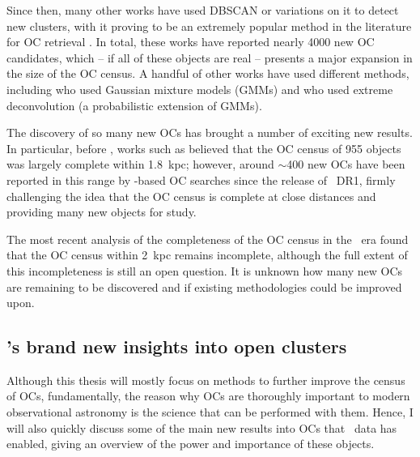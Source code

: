 Since then, many other works have used DBSCAN or variations on it to detect new clusters, with it proving to be an extremely popular method in the literature for OC retrieval \citep{castro-ginard_hunting_2019,castro-ginard_hunting_2020,castro-ginard_hunting_2022,liu_catalog_2019,he_catalogue_2021,he_new_2022,he_unveiling_hidden_2022,he_blind_allsky_2022,qin_discovery_2021,hao_sixteen_2020,hao_newly_2022,qin_hunting_2023}. In total, these works have reported nearly 4000 new OC candidates, which -- if all of these objects are real -- presents a major expansion in the size of the OC census. A handful of other works have used different methods, including \cite{cantat-gaudin_gaia_2019} who used Gaussian mixture models (GMMs) and \cite{jaehnig_membership_2021} who used extreme deconvolution (a probabilistic extension of GMMs).

The discovery of so many new OCs has brought a number of exciting new results. In particular, before \gaia, works such as \cite{kharchenko_global_2013} believed that the OC census of 955 objects was largely complete within 1.8~kpc; however, around $\sim$400 new OCs have been reported in this range by \gaia-based OC searches since the release of \gaia\ DR1, firmly challenging the idea that the OC census is complete at close distances and providing many new objects for study.

The most recent analysis of the completeness of the OC census in the \gaia\ era \citep{anders_milky_2020} found that the OC census within 2~kpc remains incomplete, although the full extent of this incompleteness is still an open question. It is unknown how many new OCs are remaining to be discovered and if existing methodologies could be improved upon.


\subsection{\gaia's brand new insights into open clusters}
\label{sec:intro:gaia:insights}

Although this thesis will mostly focus on methods to further improve the census of OCs, fundamentally, the reason why OCs are thoroughly important to modern observational astronomy is the science that can be performed with them. Hence, I will also quickly discuss some of the main new results into OCs that \gaia\ data has enabled, giving an overview of the power and importance of these objects.

